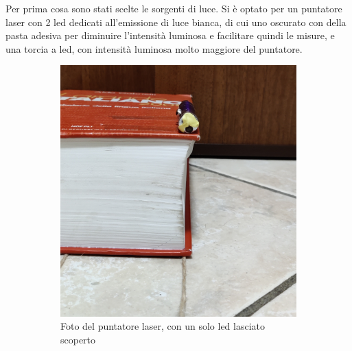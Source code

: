 \documentclass{article}
\begin{document}
Per prima cosa sono stati scelte le sorgenti di luce. Si è optato per un puntatore laser con 2 led dedicati all'emissione di luce bianca, di cui uno oscurato con della pasta adesiva per diminuire l'intensità luminosa e facilitare quindi le misure, e una torcia a led, con intensità luminosa molto maggiore del puntatore. 

\begin{figure}[h!]
    \centering
    \begin{subfigure}[b]{0.4\linewidth}
        \includegraphics[width=\linewidth]{LedLungo0_Puntatore.jpg}
        \caption{Foto del puntatore laser, con un solo led lasciato scoperto}
    \end{subfigure}
    \begin{subfigure}[b]{0.32\linewidth}

\end{subfigure}
\end{figure}
\end{document}
